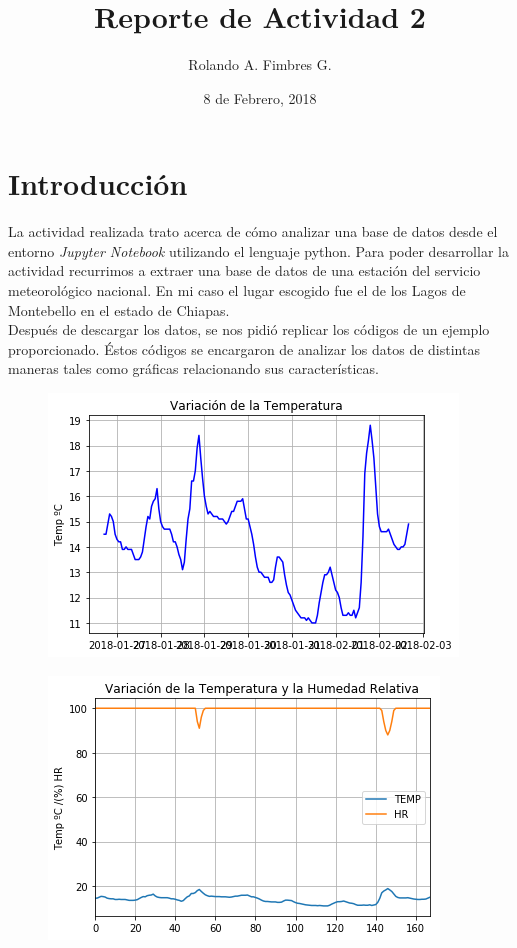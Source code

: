 \documentclass{article}
\title{Reporte de Actividad 2}
\author{Rolando A. Fimbres G.}
\date{8 de Febrero, 2018}
\begin{document}
\maketitle

\section{Introducción}
La actividad realizada trato acerca de cómo analizar una base de datos desde el entorno \textit{Jupyter Notebook} utilizando el lenguaje python. Para poder desarrollar la actividad recurrimos a extraer una base de datos de una estación del servicio meteorológico nacional. En mi caso el lugar escogido fue el de los Lagos de Montebello en el estado de Chiapas.\\
Después de descargar los datos, se nos pidió replicar los códigos de un ejemplo proporcionado. Éstos códigos se encargaron de analizar los datos de distintas maneras tales como gráficas relacionando sus características. 

\begin{figure}[h!]
    \centering
    \includegraphics[width=\linewidth]{vt_vs_t.png}
\end{figure}

\begin{figure}[h!]
    \centering
    \includegraphics[width=\linewidth]{vthr.png}
\end{figure}
\end{document}
